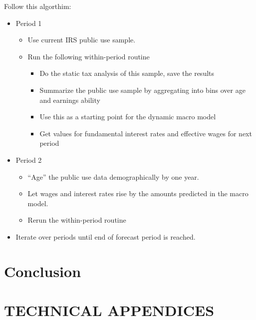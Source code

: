 \documentclass[letterpaper,12pt]{article}
\theoremstyle{definition}
\numberwithin{equation}{section}
\begin{document}
\begin{spacing}{1.5}
  Follow this algorthim:
  \begin{itemize}
    \item Period 1
    \begin{itemize}
      \item Use current IRS public use sample.
      \item Run the following within-period routine
      \begin{itemize}
        \item Do the static tax analysis of this sample, save the results
        \item Summarize the public use sample by aggregating into bins over age and earnings ability
        \item Use this as a starting point for the dynamic macro model
        \item Get values for fundamental interest rates and effective wages for next period
      \end{itemize}
    \end{itemize}
  \item Period 2
    \begin{itemize}
      \item “Age” the public use data demographically by one year.
      \item Let wages and interest rates rise by the amounts predicted in the macro model.
      \item Rerun the within-period routine
    \end{itemize}
  \item Iterate over periods until end of forecast period is reached.
  \end{itemize}


\section{Conclusion}\label{SecConclusion}


\end{spacing}


\newpage
\renewcommand{\theequation}{A.\arabic{section}.\arabic{equation}}
\renewcommand{\thedefinition}{A.\arabic{section}.\arabic{definition}}
\renewcommand{\thesection}{A-\arabic{section}}   %

\setcounter{equation}{0}                         %
\setcounter{section}{0}                          %
\section*{TECHNICAL APPENDICES}

\setcounter{definition}{0}
\setcounter{equation}{0}                         %




\newpage

\end{document}
